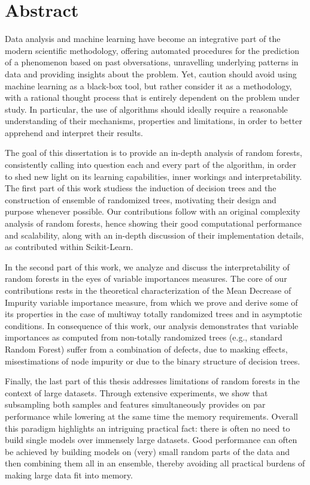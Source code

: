 
\chapter*{Abstract}

Data analysis and machine learning have become an integrative part of the
modern scientific methodology, offering automated procedures for the prediction
of a phenomenon based on past obversations, unravelling underlying patterns in
data and providing insights about the problem. Yet, caution should
avoid using machine learning as a black-box tool, but rather consider it as a
methodology, with a rational thought process that is entirely dependent on the
problem under study. In particular, the use of algorithms
should ideally require a reasonable understanding of their
mechanisms, properties and limitations, in order to better apprehend and
interpret their results.

The goal of this dissertation is to provide an in-depth
analysis of random forests, consistently calling into
question each and every part of the algorithm, in order to shed new light on
its learning capabilities, inner workings and interpretability. The first
part of this work studiess the induction of decision trees and the construction of
ensemble of randomized trees, motivating their design and purpose whenever
possible. Our contributions follow with an original complexity
analysis of random forests, hence showing their good computational performance
and scalability, along with an in-depth discussion of their
implementation details, as contributed within Scikit-Learn.

In the second part of this work, we analyze and discuss the interpretability of
random forests in the eyes of variable importances measures. The core of our
contributions rests in the theoretical characterization of the Mean Decrease of
Impurity variable importance measure, from which we prove and derive some of
its properties in the case of multiway totally randomized trees and in
asymptotic conditions. In consequence of this work, our analysis  demonstrates
that variable importances as computed from non-totally randomized trees (e.g.,
standard Random Forest) suffer from a combination of defects, due to masking
effects, misestimations of node impurity or due to the binary structure of
decision trees.

Finally, the last part of this thesis addresses limitations of random forests
in the context of large datasets. Through extensive experiments, we show
that subsampling both samples and features simultaneously provides on
par performance while lowering at the same time the memory requirements.
Overall this paradigm highlights an intriguing practical fact: there is often
no need to build single models over immensely large datasets. Good performance
can often be achieved by building models on (very) small random parts of the
data and then combining them all in an ensemble, thereby avoiding all practical burdens of making large data fit into memory.
